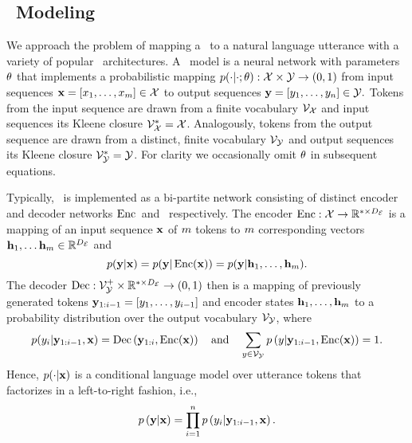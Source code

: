 \subsection{\SequencetoSequence~Modeling}

We approach the problem of mapping a \meaningrepresentation~to
a natural language utterance with a variety of popular \sequencetosequence~architectures. 
A \sequencetosequence~model is a neural network with parameters $\theta$
that implements a probabilistic mapping
$p(\cdot|\cdot;\theta) : \mathcal{X} \times \mathcal{Y} \rightarrow
(0,1)$ from input sequences $\mathbf{x} = \left[x_1,\ldots,x_{m}\right] \in \mathcal{X}$
to output sequences $\mathbf{y} = \left[y_1, \ldots, y_n\right] \in \mathcal{Y}.$
Tokens from the input sequence are drawn from a finite vocabulary $\mathcal{V}_{\mathcal{X}}$ and input sequences its
Kleene closure $\mathcal{V}_{\mathcal{X}}^* = \mathcal{X}$. 
Analogously, tokens from the output sequence are drawn from a distinct, finite vocabulary $\mathcal{V}_{\mathcal{Y}}$ and output sequences its
Kleene closure $\mathcal{V}_{\mathcal{Y}}^* = \mathcal{Y}$. For clarity we occasionally 
omit $\theta$ in subsequent equations.

Typically, \gen~is implemented as a bi-partite network consisting of distinct
encoder and decoder networks $\operatorname{Enc}$~and \decMod~respectively. 
The encoder $\operatorname{Enc} : \mathcal{X} \rightarrow \mathbb{R}^{*\times{D_\mathcal{E}}}$ is a mapping of an input sequence $\mathbf{x}$ of $m$ tokens to
$m$ corresponding  vectors $\mathbf{h}_1,\ldots\mathbf{h}_{m} \in \mathbb{R}^{{D_\mathcal{E}}}$ and
\[ p(\mathbf{y}|\mathbf{x}) = p(\mathbf{y}|\operatorname{Enc}(\mathbf{x})) = p(\mathbf{y}|\mathbf{h}_1,\ldots,\mathbf{h}_{m}).\]
The decoder $\operatorname{Dec} : \mathcal{V}_{\mathcal{Y}}^+ \times \mathbb{R}^{*\times {D_\mathcal{E}}} \rightarrow (0,1)$ then is 
a mapping of previously generated tokens $\mathbf{y}_{1:i-1} = \left[y_1,\ldots,y_{i-1}\right]$ and encoder states $\mathbf{h}_1,\ldots,\mathbf{h}_{m}$ to a probability distribution over
the output vocabulary $\mathcal{V}_{\mathcal{Y}}$, where
\[ p(y_i|\mathbf{y}_{1:i-1},\mathbf{x}) = \operatorname{Dec}\left(\mathbf{y}_{1:i}, \operatorname{Enc}(\mathbf{x})\right)   \quad \textrm{and} \quad \sum_{y\in \mathcal{V}_{\mathcal{Y}}} p\left(y| \mathbf{y}_{1:i-1}, \operatorname{Enc}(\mathbf{x})\right) = 1.  \]
Hence, $p(\cdot|\mathbf{x})$ is a conditional
language model over utterance tokens that factorizes in a left-to-right fashion, i.e.,
\[p\left( \mathbf{y}| \mathbf{x} \right) = \prod_{i=1}^n p\left(y_i|\mathbf{y}_{1:i-1},\mathbf{x}\right). \]


